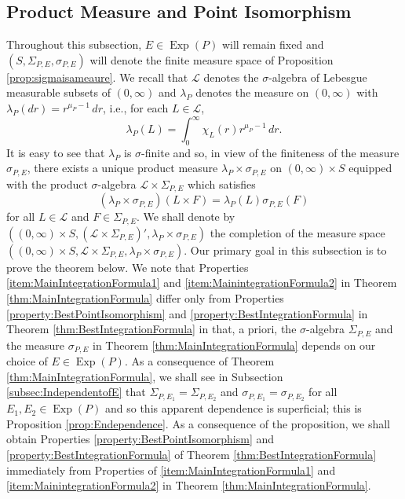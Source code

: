 \documentclass[11pt]{article}
\theoremstyle{remark}
\newcommand\Exp{\operatorname{Exp}}
\begin{document}
\subsection{Product Measure and Point Isomorphism}\label{subsec:ProductMeasure}

Throughout this subsection, $E\in\Exp(P)$ will remain fixed and $(S,\Sigma_{P,E},\sigma_{P,E})$ will denote the finite measure space of Proposition \ref{prop:sigmaisameaure}. We recall that $\mathcal{L}$ denotes the $\sigma$-algebra of Lebesgue measurable subsets of $(0,\infty)$ and  $\lambda_P$ denotes the measure on $(0,\infty)$ with $\lambda_P(dr)=r^{\mu_P-1}\,dr$, i.e., for each $L\in\mathcal{L}$,
\begin{equation*}
\lambda_P(L)=\int_0^\infty \chi_L(r)r^{\mu_P-1}\,dr.
\end{equation*}
It is easy to see that $\lambda_P$ is $\sigma$-finite and so, in view of the finiteness of the measure $\sigma_{P,E}$, there exists a unique product measure $\lambda_P\times\sigma_{P,E}$ on $(0,\infty)\times S$ equipped with the product $\sigma$-algebra $\mathcal{L}\times\Sigma_{P,E}$ which satisfies
\begin{equation*}
    (\lambda_P\times\sigma_{P,E})(L\times F)=\lambda_P(L)\sigma_{P,E}(F)
\end{equation*}
for all $L\in\mathcal{L}$ and $F\in\Sigma_{P,E}$. We shall denote by $((0,\infty)\times S,(\mathcal{L}\times\Sigma_{P,E})',\lambda_P\times\sigma_{P,E})$ the completion of the measure space $((0,\infty)\times S,\mathcal{L}\times\Sigma_{P,E},\lambda_P\times\sigma_{P,E})$. Our primary goal in this subsection is to prove the theorem below. We note that Properties \ref{item:MainIntegrationFormula1} and \ref{item:MainintegrationFormula2} in Theorem \ref{thm:MainIntegrationFormula} differ only from Properties \ref{property:BestPointIsomorphism} and \ref{property:BestIntegrationFormula} in Theorem \ref{thm:BestIntegrationFormula} in that, a priori, the $\sigma$-algebra $\Sigma_{P,E}$ and the measure $\sigma_{P,E}$ in Theorem \ref{thm:MainIntegrationFormula} depends on our choice of $E\in\Exp(P)$. As a consequence of Theorem \ref{thm:MainIntegrationFormula}, we shall see in Subsection \ref{subsec:IndependentofE} that $\Sigma_{P,E_1}=\Sigma_{P,E_2}$ and $\sigma_{P,E_1}=\sigma_{P,E_2}$ for all $E_1,E_2\in\Exp(P)$ and so this apparent dependence is superficial; this is Proposition \ref{prop:Endependence}. As a consequence of the proposition, we shall obtain Properties \ref{property:BestPointIsomorphism} and \ref{property:BestIntegrationFormula} of Theorem \ref{thm:BestIntegrationFormula} immediately from Properties of \ref{item:MainIntegrationFormula1} and \ref{item:MainintegrationFormula2} in Theorem \ref{thm:MainIntegrationFormula}.
\end{document}
